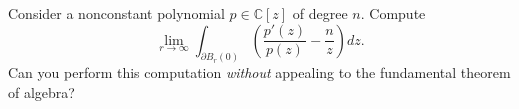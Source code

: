 \documentclass{homework}
\begin{document}
                                                                                                                                                                                          \begin{problem}
                                                                                                                                                                                            Consider a nonconstant polynomial $p \in \mathbb{C}[z]$ of degree $n$.  Compute
                                                                                                                                                                                              \[
                                                                                                                                                                                                  \lim_{r \to \infty} \int_{\partial B_r(0)} \left( \frac{p'(z)}{p(z)} - \frac{n}{z} \right) dz.
                                                                                                                                                                                                    \]
                                                                                                                                                                                                      Can you perform this computation \textit{without} appealing to the
                                                                                                                                                                                                        fundamental theorem of algebra?
                                                                                                                                                                                                        \end{problem}
\end{document}
